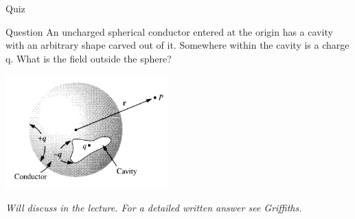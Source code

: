 %
%


{
\problemslide

\begin{frame}{Quiz}

\begin{blockexmplque}{Question}
 An uncharged spherical conductor entered at the origin has a cavity with an
 arbitrary shape carved  out of it. Somewhere within the cavity is a charge q.
 What is the field outside the sphere?\\
 \begin{center}
     \includegraphics[width=0.47\textwidth]{./images/problems/lect3_conductor_cavity.png}
 \end{center}
\end{blockexmplque}

\vspace{0.1cm}

{\small
\it Will discuss in the lecture. For a detailed written answer see Griffiths.
}

\end{frame}


} %



%
%
%


